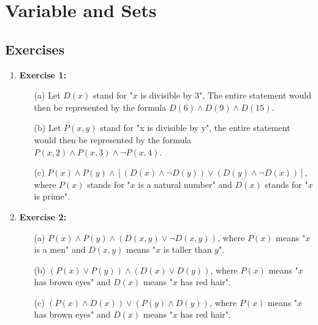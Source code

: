 \documentclass{article} %
\begin{document}
    \section{Variable and Sets}

    \subsection*{Exercises} %
    
    \begin{enumerate}
        \item \textbf{Exercise 1:}
        \begin{itemize}
            \item[(a)] Let $D(x)$ stand for "$x$ is divisible by 3", The entire statement would then be represented by the formula $D(6) \land D(9) \land D(15)$.
            \item[(b)] Let $P(x, y)$ stand for "x is divisible by y", the entire statement would then be represented by the formula $P(x, 2) \land P(x, 3) \land \neg P(x, 4)$.
            \item[(c)] $P(x) \land P(y) \land [(D(x) \land \neg D(y)) \lor (D(y) \land \neg D(x))]$, where $P(x)$ stands for "$x$ is a natural number" and $D(x)$ stands for "$x$ is prime".
        \end{itemize} 

        \item \textbf{Exercise 2:}
        \begin{itemize}
            \item[(a)] $P(x) \land P(y) \land (D(x, y) \lor \neg D(x, y))$, where $P(x)$ means "$x$ is a men" and $D(x, y)$ means "$x$ is taller than $y$".
            \item[(b)] $(P(x) \lor P(y)) \land (D(x) \lor D(y))$, where $P(x)$ means "$x$ has brown eyes" and $D(x)$ means "$x$ has red hair".
            \item[(c)] $(P(x) \land D(x)) \lor (P(y) \land D(y))$, where $P(x)$ means "$x$ has brown eyes" and $D(x)$ means "$x$ has red hair".
        \end{itemize}


\end{enumerate}
\end{document}
